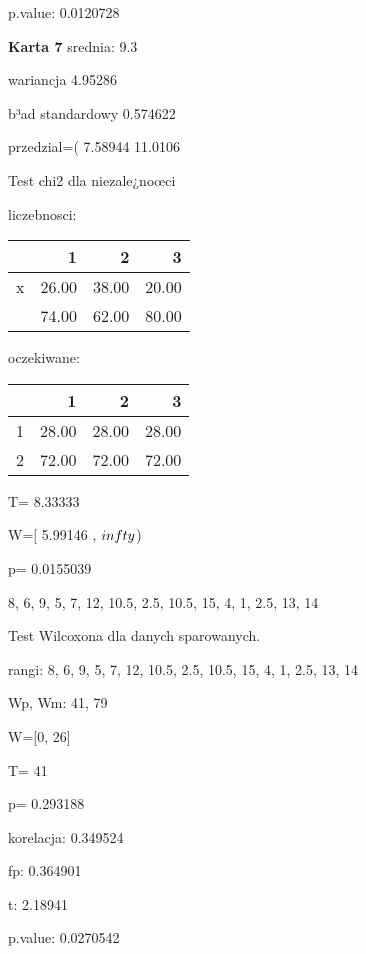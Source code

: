 \documentclass[a4paper,12pt]{article}
\begin{document}
\begin{multicols}{3}
     p.value: 0.0120728 \vspace{1cm} 

  \textbf{Karta  7 } 
 srednia: 9.3 
     
     wariancja 4.95286  
     
     b³ad standardowy 0.574622 
     
     przedzial=( 7.58944 11.0106 \vspace{1cm} 

  Test chi2 dla niezale¿noœci 
   
   liczebnosci: %
\begin{tabular}{rrrr}
  \hline
 & 1 & 2 & 3 \\
  \hline
x & 26.00 & 38.00 & 20.00 \\
   & 74.00 & 62.00 & 80.00 \\
   \hline
\end{tabular}
 
   
   oczekiwane: %
\begin{tabular}{rrrr}
  \hline
 & 1 & 2 & 3 \\
  \hline
1 & 28.00 & 28.00 & 28.00 \\
  2 & 72.00 & 72.00 & 72.00 \\
   \hline
\end{tabular}
 
   
   T= 8.33333 
   
   W=[ 5.99146 , $\\infty$) 
   
   p= 0.0155039 \vspace{1cm} 

  8, 6, 9, 5, 7, 12, 10.5, 2.5, 10.5, 15, 4, 1, 2.5, 13, 14 

  Test Wilcoxona dla danych sparowanych. 
  
  rangi: 8, 6, 9, 5, 7, 12, 10.5, 2.5, 10.5, 15, 4, 1, 2.5, 13, 14 
  
  Wp, Wm:  41,  79 
  
  W=[0, 26]  
  
  T=  41 
  
  p= 0.293188 \vspace{1cm} 

  korelacja: 0.349524
     
     fp: 0.364901
     
     t: 2.18941
     
     p.value: 0.0270542 \vspace{1cm} 


\end{multicols}
\end{document}
